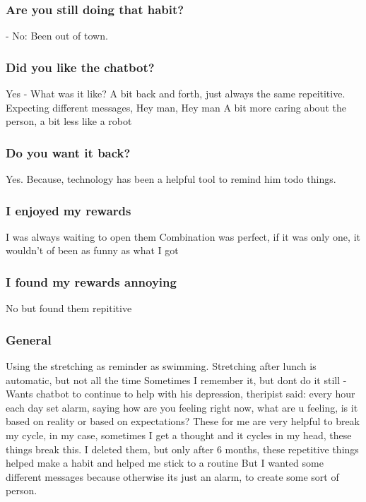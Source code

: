 \documentclass{scaffold/sigchi}
\begin{document}
\subsubsection{Are you still doing that habit?}
- No:
Been out of town.

\subsubsection{Did you like the chatbot?}
Yes
- What was it like?
A bit back and forth, just always the same repeititive.
Expecting different messages, Hey man, Hey man
A bit more caring about the person, a bit less like a robot

\subsubsection{Do you want it back?}
Yes. Because, technology has been a helpful tool to remind him todo things.


\subsubsection{I enjoyed my rewards}
I was always waiting to open them
Combination was perfect, if it was only one, it wouldn't of been as funny as what I got

\subsubsection{I found my rewards annoying}
No but found them repititive

\subsubsection{General}
Using the stretching as reminder as swimming.
Stretching after lunch is automatic, but not all the time
Sometimes I remember it, but dont do it still
- Wants chatbot to continue to help with his depression, theripist said: every hour each day set alarm, saying how are you feeling right now, what are u feeling, is it based on reality or based on expectations? These for me are very helpful to break my cycle, in my case, sometimes I get a thought and it cycles in my head, these things break this. I deleted them, but only after 6 months, these repetitive things helped make a habit and helped me stick to a routine
But I wanted some different messages because otherwise its just an alarm, to create some sort of person.
\end{document}
